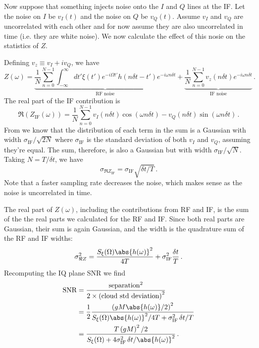 
Now suppose that something injects noise onto the $I$ and $Q$ lines at the IF.
Let the noise on $I$ be $v_I(t)$ and the noise on $Q$ be $v_Q(t)$.
Assume $v_I$ and $v_Q$ are uncorrelated with each other and for now assume they are also uncorrelated in time (i.e. they are white noise).
We now calculate the effect of this nosie on the statistics of $Z$.

Defining $v_z \equiv v_I + i v_Q$, we have
\begin{equation}
Z(\omega) =
\underbrace{\frac{1}{N}\sum_{n=0}^{N-1}\int_{-\infty}^\infty dt' \xi(t')
e^{-i \Omega t'} h(n \delta t - t') e^{-i \omega n \delta t}
}_\text{RF noise}
+
\underbrace{
\frac{1}{N} \sum_{n=0}^{N-1} v_z(n \delta t) e^{-i \omega n \delta t}
}_\text{IF noise}
\, .
\end{equation}
The real part of the IF contribution is
\begin{equation}
  \Re \left( Z_\text{IF} (\omega) \right) = \frac{1}{N} \sum_{n=0}^{N-1}
      v_I(n \delta t) \cos(\omega n \delta t)
    - v_Q(n \delta t) \sin(\omega n \delta t)
  \, .
\end{equation}
From \cite{Sank:whiteNoiseDFT} we know that the distribution of each term in the sum is a Gaussian with width $\sigma_\text{IF} / \sqrt{2N}$ where $\sigma_\text{IF}$ is the standard deviation of both $v_I$ and $v_Q$, assuming they're equal.
The sum, therefore, is also a Gaussian but with width $\sigma_\text{IF} / \sqrt{N}$.
Taking $N = T / \delta t$, we have
\begin{equation}
  \sigma_{\Re Z_\text{IF}} = \sigma_\text{IF} \sqrt{\delta t / T} \, .
\end{equation}
Note that a faster sampling rate decreases the noise, which makes sense as the noise is uncorrelated in time.


The real part of $Z(\omega)$, including the contributions from RF and IF, is the sum of the the real parts we calculated for the RF and IF.
Since both real parts are Gaussian, their sum is again Gaussian, and the width is the quadrature sum of the RF and IF widths:
\begin{equation}
  \sigma_{\Re Z}^2 =
    \frac{S_\xi(\Omega) \abs{h(\omega)}^2}{4T}
    + \sigma_\text{IF}^2 \frac{\delta t}{T} \, .
\end{equation}
Recomputing the IQ plane SNR we find
\begin{align}
  \text{SNR}
    &= \frac{\text{separation}^2}{2 \times \left( \text{cloud std deviation} \right)^2} \nonumber \\
    &= \frac{1}{2}
       \frac{\left( g M \abs{h(\omega)} / 2 \right)^2}
            {S_\xi(\Omega) \abs{h(\omega)}^2 / 4T + \sigma_\text{IF}^2 \, \delta t / T} \nonumber \\
    &= \frac{T \left( g M \right)^2 / 2}
            {S_\xi(\Omega) + 4 \sigma_\text{IF}^2 \, \delta t / \abs{h(\omega)}^2} \nonumber
  \, .
\end{align}

